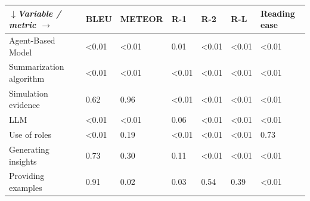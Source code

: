 \begin{tabular}{|l|l|l|l|l|l|l|}
\hline
\textit{$\downarrow$Variable / metric $\rightarrow$} & BLEU & METEOR & R-1 & R-2 & R-L & Reading ease \\
 \hline
 Agent-Based Model & \textless{}0.01 & \textless{}0.01 & 0.01 & \textless{}0.01 & \textless{}0.01 & \textless{}0.01 \\
 \hline
 Summarization algorithm & \textless{}0.01 & \textless{}0.01 & \textless{}0.01 & \textless{}0.01 & \textless{}0.01 & \textless{}0.01 \\
 \hline
 Simulation evidence & 0.62 & 0.96 & \textless{}0.01 & \textless{}0.01 & \textless{}0.01 & \textless{}0.01 \\
 \hline
 LLM & \textless{}0.01 & \textless{}0.01 & 0.06 & \textless{}0.01 & \textless{}0.01 & \textless{}0.01 \\
 \hline
 Use of roles & \textless{}0.01 & 0.19 & \textless{}0.01 & \textless{}0.01 & \textless{}0.01 & 0.73 \\
 \hline
 Generating insights & 0.73 & 0.30 & 0.11 & \textless{}0.01 & \textless{}0.01 & \textless{}0.01 \\
 \hline
 Providing examples & 0.91 & 0.02 & 0.03 & 0.54 & 0.39 & \textless{}0.01 \\
\hline
\end{tabular}
